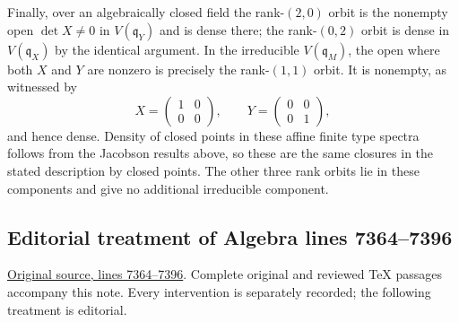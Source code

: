 \begin{example}
Finally, over an algebraically closed field the rank-$(2,0)$ orbit
is the nonempty open $\det X\ne0$ in $V(\mathfrak q_Y)$ and is
dense there; the rank-$(0,2)$ orbit is dense in $V(\mathfrak q_X)$
by the identical argument. In the irreducible $V(\mathfrak q_M)$,
the open where both $X$ and $Y$ are nonzero is precisely the
rank-$(1,1)$ orbit. It is nonempty, as witnessed by
$$
X=\begin{pmatrix}1&0\\0&0\end{pmatrix},\qquad
Y=\begin{pmatrix}0&0\\0&1\end{pmatrix},
$$
and hence dense. Density of closed points in these affine finite
type spectra follows from the Jacobson results above, so these
are the same closures in the stated description by closed points.
The other three rank orbits lie in these components and give no
additional irreducible component.
\end{example}


\subsection{Editorial treatment of Algebra lines 7364--7396}

\hypertarget{algebra-context-068}{}

\noindent\href{https://github.com/stacks/stacks-project/blob/a04446e57ec1fbc252a871afcec7752fb2807b14/algebra.tex\#L7364}{Original source, lines 7364--7396}. Complete original and reviewed TeX passages accompany this note. Every intervention is separately recorded; the following treatment is editorial.


